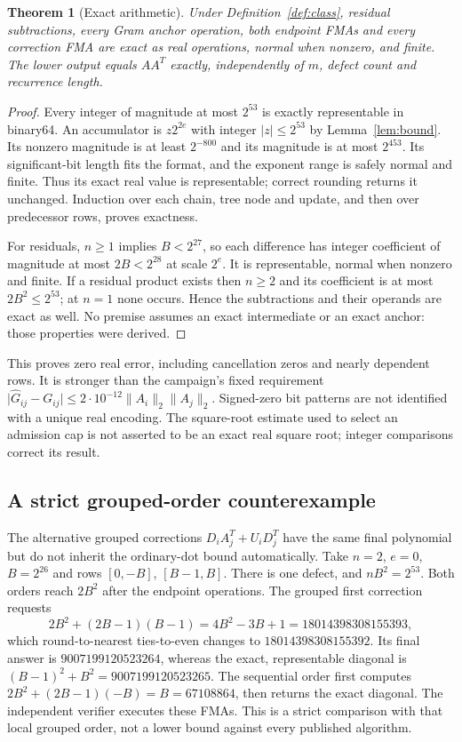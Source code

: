 \documentclass[10pt,a4paper]{article}
\newtheorem{theorem}{Theorem}
\newcommand{\abs}[1]{\lvert#1\rvert}
\begin{document}
\begin{theorem}[Exact arithmetic]\label{thm:fp}
Under Definition~\ref{def:class}, residual subtractions, every Gram anchor
operation, both endpoint FMAs and every correction FMA are exact as real
operations, normal when nonzero, and finite. The lower output equals $AA^T$
exactly, independently of $m$, defect count and recurrence length.
\end{theorem}
\begin{proof}
Every integer of magnitude at most $2^{53}$ is exactly representable in
binary64. An accumulator is $z2^{2e}$ with integer $\abs z\le2^{53}$ by
Lemma~\ref{lem:bound}. Its nonzero magnitude is at least $2^{-800}$ and its
magnitude is at most $2^{453}$. Its significant-bit length fits the format,
and the exponent range is safely normal and finite. Thus its exact real
value is representable; correct rounding returns it unchanged. Induction over
each chain, tree node and update, and then over predecessor rows, proves exactness.

For residuals, $n\ge1$ implies $B<2^{27}$, so each difference has integer
coefficient of magnitude at most $2B<2^{28}$ at scale $2^e$. It is representable,
normal when nonzero and finite. If a residual product exists then $n\ge2$ and
its coefficient is at most $2B^2\le2^{53}$; at $n=1$ none occurs. Hence the
subtractions and their operands are exact as well. No premise assumes an
exact intermediate or an exact anchor: those properties were derived.
\end{proof}
This proves zero real error, including cancellation zeros and nearly dependent
rows. It is stronger than the campaign's fixed requirement
$\abs{\widehat G_{ij}-G_{ij}}\le2\cdot10^{-12}\|A_i\|_2\|A_j\|_2$.
Signed-zero bit patterns are not identified with a unique real encoding.
The square-root estimate used to select an admission cap is not asserted to
be an exact real square root; integer comparisons correct its result.

\subsection{A strict grouped-order counterexample}\label{sec:witness}
The alternative grouped corrections $D_iA_j^T+U_iD_j^T$ have the same final
polynomial but do not inherit the ordinary-dot bound automatically. Take
$n=2$, $e=0$, $B=2^{26}$ and rows $[0,-B]$, $[B-1,B]$. There is one defect,
and $nB^2=2^{53}$. Both orders reach $2B^2$ after the endpoint operations.
The grouped first correction requests
\[
2B^2+(2B-1)(B-1)=4B^2-3B+1=18014398308155393,
\]
which round-to-nearest ties-to-even changes to $18014398308155392$.
Its final answer is $9007199120523264$, whereas the exact, representable
diagonal is $(B-1)^2+B^2=9007199120523265$. The sequential order first computes
$2B^2+(2B-1)(-B)=B=67108864$, then returns the exact diagonal. The independent
verifier executes these FMAs. This is a strict comparison with that local
grouped order, not a lower bound against every published algorithm.
\end{document}
